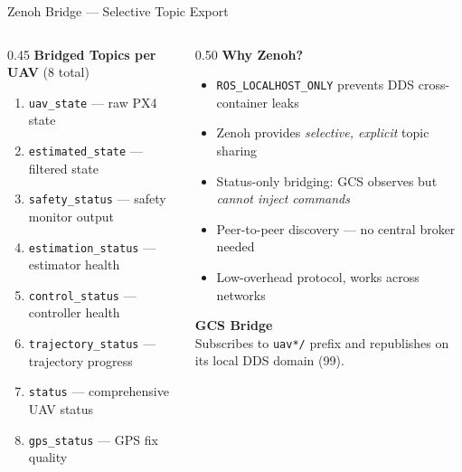\documentclass[aspectratio=169, 10pt]{beamer}
\begin{document}
\begin{frame}{Zenoh Bridge --- Selective Topic Export}
\begin{columns}[T]
\begin{column}{0.45\textwidth}
\textbf{Bridged Topics per UAV} (8 total)

\vspace{0.3em}
\small
\begin{enumerate}
  \item \texttt{uav\_state} --- raw PX4 state
  \item \texttt{estimated\_state} --- filtered state
  \item \texttt{safety\_status} --- safety monitor output
  \item \texttt{estimation\_status} --- estimator health
  \item \texttt{control\_status} --- controller health
  \item \texttt{trajectory\_status} --- trajectory progress
  \item \texttt{status} --- comprehensive UAV status
  \item \texttt{gps\_status} --- GPS fix quality
\end{enumerate}
\end{column}
\begin{column}{0.50\textwidth}
\textbf{Why Zenoh?}
\begin{itemize}\small
  \item \texttt{ROS\_LOCALHOST\_ONLY} prevents DDS cross-container leaks
  \item Zenoh provides \emph{selective, explicit} topic sharing
  \item Status-only bridging: GCS observes but \emph{cannot inject commands}
  \item Peer-to-peer discovery --- no central broker needed
  \item Low-overhead protocol, works across networks
\end{itemize}

\vspace{0.5em}
\textbf{GCS Bridge}\\[0.2em]
\small
Subscribes to \texttt{uav*/} prefix and republishes on its local DDS domain (99).
\end{column}
\end{columns}
\end{frame}
\end{document}
